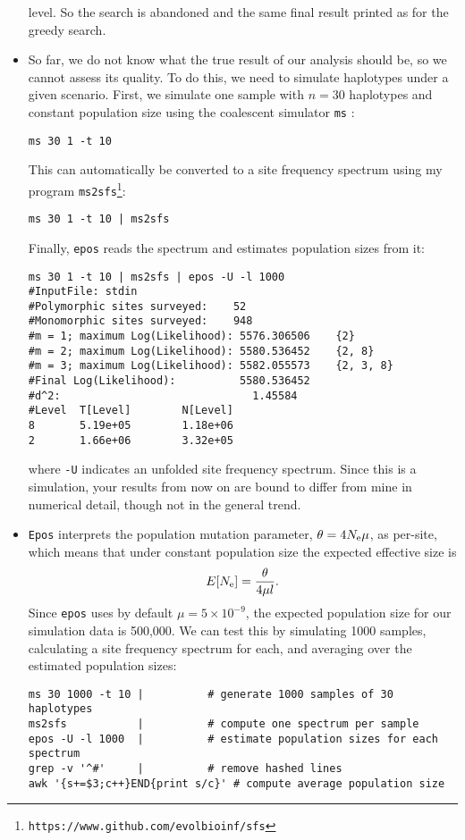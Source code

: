 \documentclass[a4paper, english]{article}
\newcommand{\ty}{\texttt}
\begin{document}
\begin{itemize}
level. So the search is abandoned and the same final result printed as
for the greedy search.
\item So far, we do not know what the true result of our analysis
  should be, so we cannot assess its quality. To do this, we need to
  simulate haplotypes under a given scenario. First, we simulate one
  sample with $n=30$ haplotypes and constant population size using the
  coalescent simulator \ty{ms} \citep{hud02:gen}:
\begin{verbatim}
ms 30 1 -t 10 
\end{verbatim}
This can automatically be converted to a site frequency spectrum using
my program \ty{ms2sfs}\footnote{\ty{https://www.github.com/evolbioinf/sfs}}:
\begin{verbatim}
ms 30 1 -t 10 | ms2sfs
\end{verbatim}
Finally, \ty{epos} reads the spectrum and estimates population
sizes from it:
\begin{verbatim}
ms 30 1 -t 10 | ms2sfs | epos -U -l 1000
#InputFile:	stdin
#Polymorphic sites surveyed:	52
#Monomorphic sites surveyed:	948
#m = 1; maximum Log(Likelihood): 5576.306506	{2}
#m = 2; maximum Log(Likelihood): 5580.536452	{2, 8}
#m = 3; maximum Log(Likelihood): 5582.055573	{2, 3, 8}
#Final Log(Likelihood):          5580.536452
#d^2:                              1.45584
#Level  T[Level]        N[Level]
8       5.19e+05        1.18e+06
2       1.66e+06        3.32e+05
\end{verbatim}
where \ty{-U} indicates an unfolded site frequency spectrum. Since
this is a simulation, your results from now on are bound to differ
from mine in
numerical detail, though not in the general trend.
\item \ty{Epos} interprets the population mutation parameter,
$\theta=4N_{\rm e}\mu$, as per-site, which means that under constant
population size the expected effective size is
\[
E[N_{\rm e}]=\frac{\theta}{4\mu l}.
\]
Since \ty{epos} uses by default $\mu=5\times 10^{-9}$, the expected
population size for our simulation data is 500,000. We can
test this by simulating 1000 samples, calculating a site frequency
spectrum for each, and averaging over the estimated population
sizes:
\begin{verbatim}
ms 30 1000 -t 10 |          # generate 1000 samples of 30 haplotypes
ms2sfs           |          # compute one spectrum per sample
epos -U -l 1000  |          # estimate population sizes for each spectrum
grep -v '^#'     |          # remove hashed lines
awk '{s+=$3;c++}END{print s/c}' # compute average population size

\end{verbatim}
\end{itemize}
\end{document}
